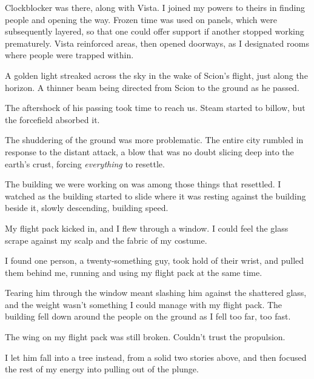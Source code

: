 Clockblocker was there, along with Vista.  I joined my powers to theirs in finding people and opening the way.  Frozen time was used on panels, which were subsequently layered, so that one could offer support if another stopped working prematurely.  Vista reinforced areas, then opened doorways, as I designated rooms where people were trapped within.



A golden light streaked across the sky in the wake of Scion's flight, just along the horizon.  A thinner beam being directed from Scion to the ground as he passed.



The aftershock of his passing took time to reach us.  Steam started to billow, but the forcefield absorbed it.



The shuddering of the ground was more problematic.  The entire city rumbled in response to the distant attack, a blow that was no doubt slicing deep into the earth's crust, forcing \emph{everything} to resettle.



The building we were working on was among those things that resettled.  I watched as the building started to slide where it was resting against the building beside it, slowly descending, building speed.



My flight pack kicked in, and I flew through a window.  I could feel the glass scrape against my scalp and the fabric of my costume.



I found one person, a twenty-something guy, took hold of their wrist, and pulled them behind me, running and using my flight pack at the same time.



Tearing him through the window meant slashing him against the shattered glass, and the weight wasn't something I could manage with my flight pack.  The building fell down around the people on the ground as I fell too far, too fast.



The wing on my flight pack was still broken.  Couldn't trust the propulsion.



I let him fall into a tree instead, from a solid two stories above, and then focused the rest of my energy into pulling out of the plunge.




